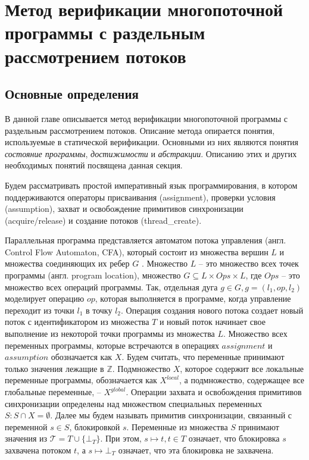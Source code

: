 \newcommand{\epp}{\mathrel{\bigoplus}}

\chapter{Метод верификации многопоточной программы с раздельным рассмотрением потоков}
\label{chapter_theory}

\section{Основные определения}

В данной главе описывается метод верификации многопоточной программы с раздельным рассмотрением потоков.
Описание метода опирается понятия, используемые в статической верификации. 
Основными из них являются понятия \textit{состояние программы}, \textit{достижимости} и \textit{абстракции}.
Описанию этих и других необходимых понятий посвящена данная секция.

Будем рассматривать простой императивный язык программирования, в котором поддерживаются операторы присваивания (assignment), проверки условия (assumption), захват и освобождение примитивов синхронизации (acquire/release) и создание потоков (thread\_create).

Параллельная программа представляется автоматом потока управления (англ. Control Flow Automaton, CFA), который состоит из множества вершин $L$  и множества соединяющих их ребер $G$ .
Множество $L$ -- это множество всех точек программы (англ. program location), множество $G \subseteq L \times Ops \times L$, где $Ops$ -- это множество всех операций программы.
Так, отдельная дуга $g \in G, g = (l_1, op, l_2)$ моделирует операцию $op$, которая выполняется в программе, когда управление переходит из точки $l_1$ в точку $l_2$.
Операция создания нового потока создает новый поток с идентификатором из множества $T$ и новый поток начинает свое выполнение из некоторой точки программы из множества $L$.
Множество всех переменных программы, которые встречаются в операциях $assignment$ и $assumption$ обозначается как $X$.
Будем считать, что переменные принимают только значения лежащие в $\mathbb{Z}$.
Подмножество $X$, которое содержит все локальные переменные программы, обозначается как $X^{local}$, а подмножество, содержащее все глобальные переменные, --  $X^{global}$. 
Операции захвата и освобождения примитивов синхронизации определены над множеством специальных переменных $S: S \cap X = \emptyset$.
Далее мы будем называть примитив синхронизации, связанный с переменной $s \in S$, блокировкой $s$.
Переменные из множества $S$ принимают значения из $\mathcal{T}=T \cup \{\bot_T\}$.
При этом, $s \mapsto t, t \in T$ означает, что блокировка $s$ захвачена потоком $t$, а $s \mapsto \bot_T$ означает, что эта блокировка не захвачена.

